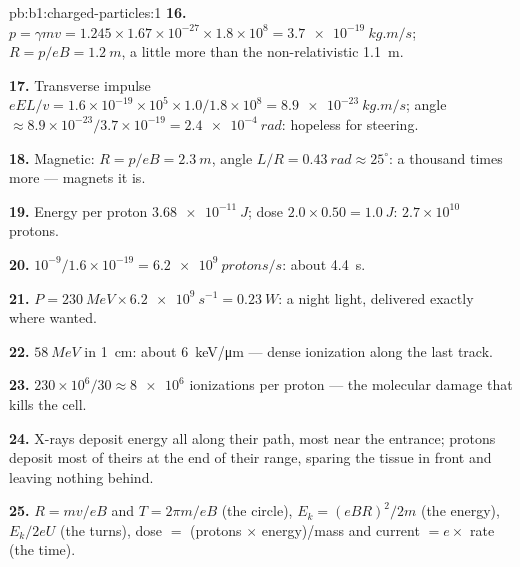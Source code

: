 \begin{solution}{pb:b1:charged-particles:1}
\textbf{16.} $p = \gamma mv = 1.245 \times 1.67\times10^{-27} \times 1.8\times10^8
= \qty{3.7e-19}{kg.m/s}$; $R = p/eB = \qty{1.2}{m}$, a little more than
the non-relativistic \qty{1.1}{m}.

\textbf{17.} Transverse impulse $eEL/v = 1.6\times10^{-19} \times 10^5 \times
1.0/1.8\times10^8 = \qty{8.9e-23}{kg.m/s}$; angle $\approx 8.9\times10^{-23}/
3.7\times10^{-19} = \qty{2.4e-4}{rad}$: hopeless for steering.

\textbf{18.} Magnetic: $R = p/eB = \qty{2.3}{m}$, angle $L/R = \qty{0.43}{rad}
\approx 25^\circ$: a thousand times more --- magnets it is.

\textbf{19.} Energy per proton $\qty{3.68e-11}{J}$; dose $2.0 \times 0.50 =
\qty{1.0}{J}$: $2.7\times10^{10}$ protons.

\textbf{20.} $10^{-9}/1.6\times10^{-19} = \qty{6.2e9}{protons/s}$: about
\qty{4.4}{s}.

\textbf{21.} $P = \qty{230}{MeV} \times \qty{6.2e9}{s^{-1}} = \qty{0.23}{W}$:
a night light, delivered exactly where wanted.

\textbf{22.} $\qty{58}{MeV}$ in \qty{1}{cm}: about \qty{6}{keV/\micro m} ---
dense ionization along the last track.

\textbf{23.} $230\times10^6/30 \approx \num{8e6}$ ionizations per proton ---
the molecular damage that kills the cell.

\textbf{24.} X-rays deposit energy all along their path, most near the
entrance; protons deposit most of theirs at the end of their range,
sparing the tissue in front and leaving nothing behind.

\textbf{25.} $R = mv/eB$ and $T = 2\pi m/eB$ (the circle), $E_k = (eBR)^2/2m$
(the energy), $E_k/2eU$ (the turns), dose $=$ (protons $\times$ energy)/mass
and current $= e \times$ rate (the time).
\end{solution}

